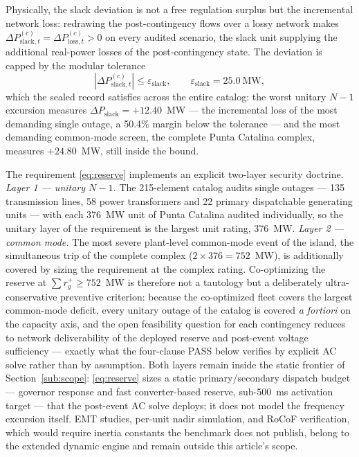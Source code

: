 Physically, the slack deviation is not a free regulation surplus but the incremental network loss: redrawing the post-contingency flows over a lossy network makes $\Delta P_{\mathrm{slack},t}^{(c)} = \Delta P_{\mathrm{loss},t}^{(c)} > 0$ on every audited scenario, the slack unit supplying the additional real-power losses of the post-contingency state. The deviation is capped by the modular tolerance
\begin{equation}
|\Delta P_{\mathrm{slack},t}^{(c)}| \le \varepsilon_{\mathrm{slack}}, \qquad \varepsilon_{\mathrm{slack}} = 25.0~\mathrm{MW},
\label{eq:slacktol}
\end{equation}
which the sealed record satisfies across the entire catalog: the worst unitary $N-1$ excursion measures $\Delta P_{\mathrm{slack}} = +12.40$~MW --- the incremental loss of the most demanding single outage, a 50.4\% margin below the tolerance --- and the most demanding common-mode screen, the complete Punta Catalina complex, measures $+24.80$~MW, still inside the bound.

The requirement \eqref{eq:reserve} implements an explicit two-layer security doctrine. \emph{Layer 1 --- unitary $N-1$.} The 215-element catalog audits single outages --- 135 transmission lines, 58 power transformers and 22 primary dispatchable generating units --- with each 376~MW unit of Punta Catalina audited individually, so the unitary layer of the requirement is the largest unit rating, 376~MW. \emph{Layer 2 --- common mode.} The most severe plant-level common-mode event of the island, the simultaneous trip of the complete complex ($2 \times 376 = 752$~MW), is additionally covered by sizing the requirement at the complex rating. Co-optimizing the reserve at $\sum r_g^+ \ge 752$~MW is therefore not a tautology but a deliberately ultra-conservative preventive criterion: because the co-optimized fleet covers the largest common-mode deficit, every unitary outage of the catalog is covered \emph{a fortiori} on the capacity axis, and the open feasibility question for each contingency reduces to network deliverability of the deployed reserve and post-event voltage sufficiency --- exactly what the four-clause PASS below verifies by explicit AC solve rather than by assumption. Both layers remain inside the static frontier of Section~\ref{sub:scope}: \eqref{eq:reserve} sizes a static primary/secondary dispatch budget --- governor response and fast converter-based reserve, sub-500~ms activation target --- that the post-event AC solve deploys; it does not model the frequency excursion itself. EMT studies, per-unit nadir simulation, and RoCoF verification, which would require inertia constants the benchmark does not publish, belong to the extended dynamic engine and remain outside this article's scope.

